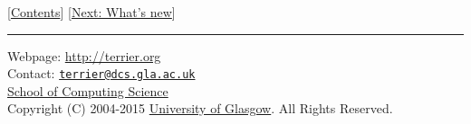 {[}\href{index.html}{Contents}{]} {[}\href{whats_new.html}{Next: What's
new}{]}

\begin{center}\rule{0.5\linewidth}{\linethickness}\end{center}

Webpage: \url{http://terrier.org}\\
Contact:
\href{mailto:terrier@dcs.gla.ac.uk}{\nolinkurl{terrier@dcs.gla.ac.uk}}\\
\href{http://www.dcs.gla.ac.uk/}{School of Computing Science}\\
Copyright (C) 2004-2015 \href{http://www.gla.ac.uk/}{University of
Glasgow}. All Rights Reserved.
